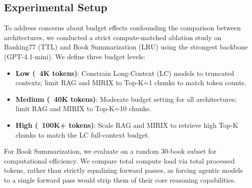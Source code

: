 \subsection{Experimental Setup}
To address concerns about budget effects confounding the comparison between architectures, we conducted a strict compute-matched ablation study on Banking77 (TTL) and Book Summarization (LRU) using the strongest backbone (GPT-4.1-mini). We define three budget levels:
\begin{itemize}
    \item \textbf{Low (~4K tokens)}: Constrain Long-Context (LC) models to truncated contexts; limit RAG and MIRIX to Top-K=1 chunks to match token counts.
    \item \textbf{Medium (~40K tokens)}: Moderate budget setting for all architectures; limit RAG and MIRIX to Top-K=10 chunks.
    \item \textbf{High (~100K+ tokens)}: Scale RAG and MIRIX to retrieve high Top-K chunks to match the LC full-context budget.
\end{itemize}
For Book Summarization, we evaluate on a random 30-book subset for computational efficiency. We compare total compute load via total processed tokens, rather than strictly equalizing forward passes, as forcing agentic models to a single forward pass would strip them of their core reasoning capabilities.

\begin{table}[h!]
\centering
{}
\caption{Compute-matched experiment results on TTL and LRU tasks (Accuracy/Score \%).}
\label{tab:compute_matched}
\end{table}

